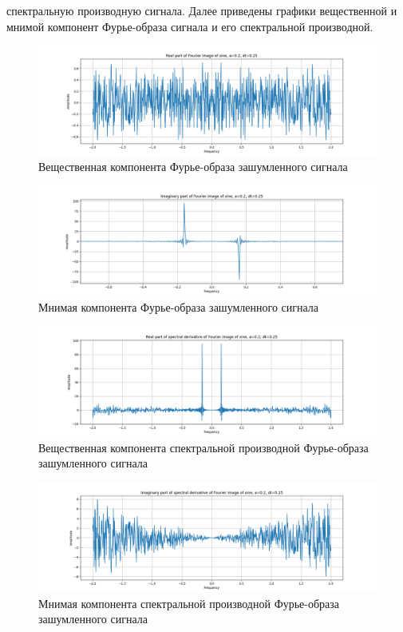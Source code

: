 \documentclass[a4paper, 12pt]{article}
\begin{document}
    спектральную производную сигнала. Далее приведены графики вещественной и мнимой компонент Фурье-образа сигнала и его спектральной производной.
    \begin{figure}[H]
        \centering
        \includegraphics[scale=0.4]{1_re_fimg_sine.png}
        \captionsetup{skip=0pt}
        \caption{Вещественная компонента Фурье-образа зашумленного сигнала}
        \label{fig:1refis}
    \end{figure}
    \begin{figure}[H]
        \centering
        \includegraphics[scale=0.4]{1_im_fimg_sine.png}
        \captionsetup{skip=0pt}
        \caption{Мнимая компонента Фурье-образа зашумленного сигнала}
        \label{fig:1imfis}
    \end{figure}
    \begin{figure}[H]
        \centering
        \includegraphics[scale=0.4]{1_re_spd_fimg_sine.png}
        \captionsetup{skip=0pt}
        \caption{Вещественная компонента спектральной производной Фурье-образа зашумленного сигнала}
        \label{fig:1respdf}
    \end{figure}
    \begin{figure}[H]
        \centering
        \includegraphics[scale=0.4]{1_im_spd_fimg_sine.png}
        \captionsetup{skip=0pt}
        \caption{Мнимая компонента спектральной производной Фурье-образа зашумленного сигнала}
        \label{fig:1imspdf}
    \end{figure}
\end{document}
